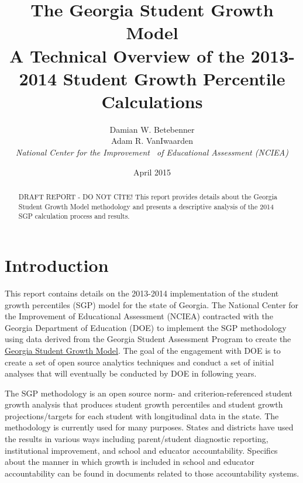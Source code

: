 \documentclass[12pt]{article}
\begin{document}
\newcommand{\pl}[1]{\textsf{PL#1}}
\newcommand{\Cov}{\ensuremath{\mbox{\textsf{Cov}}}}
\newcommand{\Diag}{\ensuremath{\mbox{\textsf{Diag}}}}
\newcommand{\Bias}{\ensuremath{\mbox{\textsf{Bias}}}}
\newcommand{\Astar}[1]{\ensuremath{#1^{^*}}}
\thispagestyle{plain}
\pagestyle{damian}

\title{\textsf{\LARGE The Georgia Student Growth Model  \\\medskip A Technical Overview of the 2013-2014 Student Growth Percentile
Calculations }}
\author{  Damian W. Betebenner    \\   Adam R. VanIwaarden    \\   \emph{National Center for the Improvement \ of Educational Assessment (NCIEA)}   }

 \date{April 2015} 

\maketitle

\newpage

\begin{abstract}
DRAFT REPORT - DO NOT CITE! This report provides details about the
Georgia Student Growth Model methodology and presents a descriptive
analysis of the 2014 SGP calculation process and results.
\end{abstract}
\newpage

\section{Introduction}\label{introduction}

This report contains details on the 2013-2014 implementation of the
student growth percentiles (SGP) model for the state of Georgia. The
National Center for the Improvement of Educational Assessment (NCIEA)
contracted with the Georgia Department of Education (DOE) to implement
the SGP methodology using data derived from the Georgia Student
Assessment Program to create the
\href{http://www.gadoe.org/Curriculum-Instruction-and-Assessment/Assessment/Pages/Georgia-Student-Growth-Model.aspx}{Georgia
Student Growth Model}. The goal of the engagement with DOE is to create
a set of open source analytics techniques and conduct a set of initial
analyses that will eventually be conducted by DOE in following years.

The SGP methodology is an open source norm- and criterion-referenced
student growth analysis that produces student growth percentiles and
student growth projections/targets for each student with longitudinal
data in the state. The methodology is currently used for many purposes.
States and districts have used the results in various ways including
parent/student diagnostic reporting, institutional improvement, and
school and educator accountability. Specifics about the manner in which
growth is included in school and educator accountability can be found in
documents related to those accountability systems.
\end{document}

